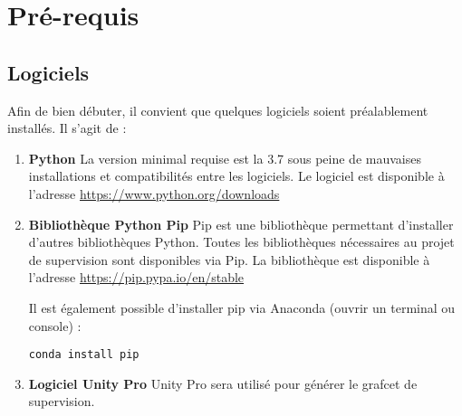 \documentclass[12pt]{report}    %
\begin{document}

\chapter{Pré-requis}
\section{Logiciels}

Afin de bien débuter, il convient que quelques logiciels soient préalablement installés.
Il s'agit de : \newline


\begin{enumerate}
\item \textbf{Python} \newline
La version minimal requise est la 3.7 sous peine de mauvaises installations et compatibilités entre les logiciels. \newline
Le logiciel est disponible à l'adresse \url{https://www.python.org/downloads} \newline
\item \textbf{Bibliothèque Python Pip} \newline 
Pip est une bibliothèque permettant d'installer d'autres bibliothèques Python. Toutes les bibliothèques nécessaires au projet de supervision sont disponibles via Pip. \newline
La bibliothèque est disponible à l'adresse \url{https://pip.pypa.io/en/stable} \newline

Il est également possible d'installer pip via Anaconda (ouvrir un terminal ou console) :
\begin{lstlisting}
conda install pip
\end{lstlisting}

\item \textbf{Logiciel Unity Pro} \newline 
Unity Pro sera utilisé pour générer le grafcet de supervision. \newline 
\end{enumerate}

\end{document}
